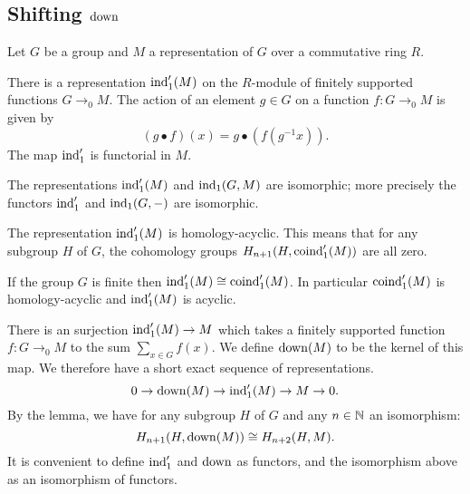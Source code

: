 \subsection{Shifting $\mathrm{down}$}
Let $G$ be a group and $M$ a representation of $G$ over a commutative ring $R$.

\begin{definition}
	There is a representation $\mathrm{ind}_1' (M)$ on the $R$-module of finitely supported
	functions $G \to_0 M$. The action of an element $g \in G$ on a function $f : G \to_0 M$ is given by
	\[
		(g \bullet f)(x) = g \bullet (f (g^{-1}x)).
	\]
	The map $\mathrm{ind}_1'$ is functorial in $M$.
\end{definition}


\begin{lemma}
	The representations $\mathrm{ind}_1'(M)$ and $\mathrm{ind}_1(G,M)$ are isomorphic; more precisely the
	functors $\mathrm{ind}_1'$ and $\mathrm{ind}_1(G,-)$ are isomorphic.
\end{lemma}

\begin{corollary}
	The representation $\mathrm{ind}_1'(M)$ is homology-acyclic. This means that
	for any subgroup $H$ of $G$, the cohomology groups $H_{n+1}(H,\mathrm{coind}_1'(M))$ are
	all zero.
\end{corollary}

\begin{corollary}
	If the group $G$ is finite then $\mathrm{ind}_1'(M) \cong \mathrm{coind}_1'(M)$.
	In particular $\mathrm{coind}_1'(M)$ is homology-acyclic and $\mathrm{ind}_1'(M)$ is acyclic.
\end{corollary}

\begin{definition}
	There is an surjection $\mathrm{ind}_1'(M) \to M$ which takes a finitely supported
	function $f : G \to_0 M$ to the sum $\sum_{x \in G} f (x)$.
	We define $\mathrm{down}(M)$ to be the kernel of this map.
	We therefore have a short exact sequence of representations.
	\[
		0 \to \mathrm{down}(M) \to \mathrm{ind}_1'(M) \to M \to 0.
	\]
	By the lemma, we have for any subgroup $H$ of $G$ and any $n \in {\mathbb N}$ an isomorphism:
	\[
		H_{n+1}(H,\mathrm{down}(M)) \cong H_{n+2}(H,M).
	\]
	It is convenient to define $\mathrm{ind}_1'$ and $\mathrm{down}$ as functors, and the isomorphism
	above as an isomorphism of functors.
\end{definition}


